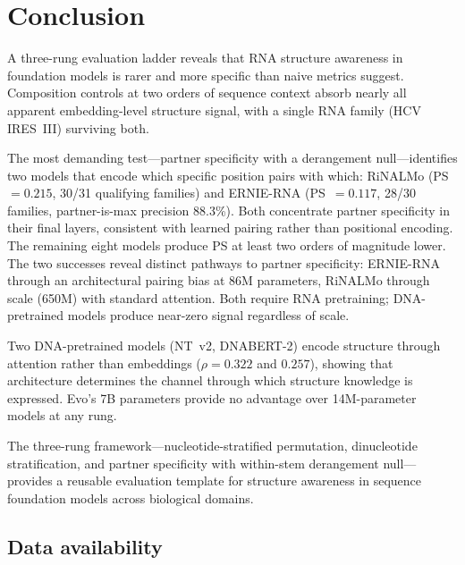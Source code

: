 \documentclass[11pt]{article}
\begin{document}
\section{Conclusion}
\label{sec:conclusion}

A three-rung evaluation ladder reveals that RNA structure awareness
in foundation models is rarer and more specific than naive metrics
suggest.  Composition controls at two orders of sequence context
absorb nearly all apparent embedding-level structure signal, with a
single RNA family (HCV IRES~III) surviving both.

The most demanding test---partner specificity with a derangement
null---identifies two models that encode which specific position
pairs with which: RiNALMo (PS~$= 0.215$, 30/31 qualifying families)
and ERNIE-RNA (PS~$= 0.117$, 28/30 families, partner-is-max
precision 88.3\%).  Both concentrate partner specificity in their
final layers, consistent with learned pairing rather than positional
encoding.  The remaining eight models produce PS at least two orders
of magnitude lower.  The two successes reveal distinct pathways to
partner specificity: ERNIE-RNA through an architectural pairing bias
at 86M parameters, RiNALMo through scale (650M) with standard
attention.  Both require RNA pretraining; DNA-pretrained models
produce near-zero signal regardless of scale.

Two DNA-pretrained models (NT~v2, DNABERT-2) encode structure through
attention rather than embeddings ($\rho = 0.322$ and $0.257$),
showing that architecture determines the channel through which
structure knowledge is expressed.  Evo's 7B parameters provide no
advantage over 14M-parameter models at any rung.

The three-rung framework---nucleotide-stratified permutation,
dinucleotide stratification, and partner specificity with within-stem
derangement null---provides a reusable evaluation template for
structure awareness in sequence foundation models across biological
domains.

\subsection*{Data availability}
\end{document}
